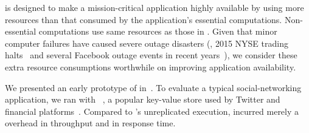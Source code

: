 \tripod is designed to make a mission-critical application highly available by 
using  more resources than that consumed by the application's essential 
computations. Non-essential computations use same resources as those in \mesos. 
Given that minor computer failures have caused severe outage disasters  (\eg, 
2015 NYSE trading halts~\cite{nyse:halt} and several Facebook outage events in 
recent 
years~\cite{facebook:outage}), we consider these extra resource consumptions 
worthwhile on improving application availability.






 We presented an early prototype of \tripod
in~\cite{tripod:apsys16}. To evaluate a typical social-networking application, 
we ran \tripod with \memcached~\cite{memcached}, a popular key-value store used 
by Twitter and financial platforms~\cite{nosql:finance}. Compared to 
\memcached's unreplicated execution, \tripod incurred merely a \tputoverhead 
overhead in throughput and \latencyoverhead in response time.

